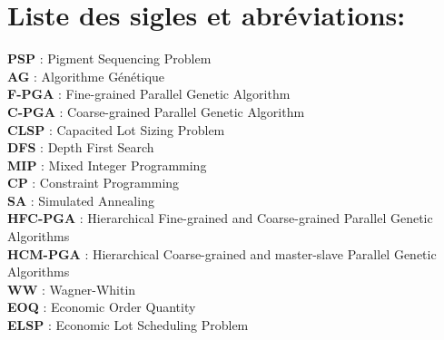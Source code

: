 \documentclass[12pt,a4paper]{article}
\begin{document}
	\newpage
	\tableofcontents
	
	\newpage
	
	\listoffigures
	
	\newpage
	
	\listoftables
	
	\newpage
	
	\listofalgorithms
	
	\newpage
	\section*{Liste des sigles et abréviations:}
	
	\vspace{1cm}
	
	\textbf{PSP} : Pigment Sequencing Problem \\
	\hspace*{.5cm} \textbf{AG} : Algorithme Génétique \\
	\hspace*{.5cm} \textbf{F-PGA} : Fine-grained Parallel Genetic Algorithm \\
	\hspace*{.5cm} \textbf{C-PGA} : Coarse-grained Parallel Genetic Algorithm \\
	\hspace*{.5cm} \textbf{CLSP} : Capacited Lot Sizing Problem \\
	\hspace*{.5cm} \textbf{DFS} : Depth First Search\\
	\hspace*{.5cm} \textbf{MIP} : Mixed Integer Programming \\
	\hspace*{.5cm} \textbf{CP} : Constraint Programming \\
	\hspace*{.5cm} \textbf{SA} : Simulated Annealing\\
	\hspace*{.5cm} \textbf{HFC-PGA} : Hierarchical Fine-grained and Coarse-grained Parallel Genetic Algorithms \\
\hspace*{.5cm} \textbf{HCM-PGA} : Hierarchical Coarse-grained and master-slave Parallel Genetic Algorithms \\
	\hspace*{.5cm} \textbf{WW} : Wagner-Whitin \\
	\hspace*{.5cm} \textbf{EOQ} : Economic Order Quantity \\
	\hspace*{.5cm} \textbf{ELSP} : Economic Lot Scheduling Problem
	
\end{document}
